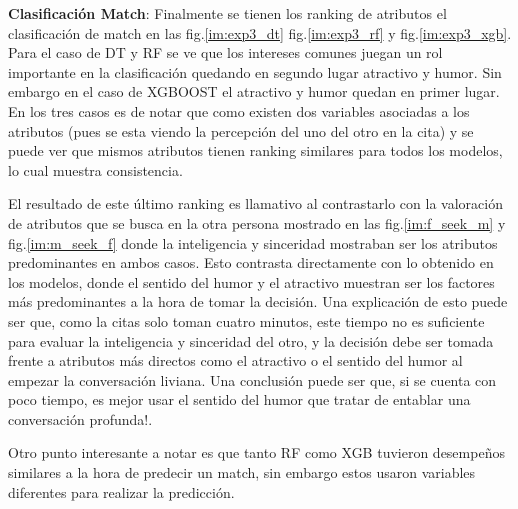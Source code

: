 


\textbf{Clasificación Match}: Finalmente se tienen los ranking de atributos el clasificación de match en las fig.\ref{im:exp3_dt} fig.\ref{im:exp3_rf} y fig.\ref{im:exp3_xgb}. Para el caso de DT y RF se ve que los intereses comunes juegan un rol importante en la clasificación quedando en segundo lugar atractivo y humor. Sin embargo en el caso de XGBOOST el atractivo y humor quedan en primer lugar. En los tres casos es de notar que como existen dos variables asociadas a los atributos (pues se esta viendo la percepción del uno del otro en la cita) y se puede ver que mismos atributos tienen ranking similares para todos los modelos, lo cual muestra consistencia.

El resultado de este último ranking es llamativo al contrastarlo con la valoración de atributos que se busca en la otra persona mostrado en las fig.\ref{im:f_seek_m} y fig.\ref{im:m_seek_f} donde la inteligencia y sinceridad mostraban ser los atributos predominantes en ambos casos. Esto contrasta directamente con lo obtenido en los modelos, donde el sentido del humor y el atractivo muestran ser los factores más predominantes a la hora de tomar la decisión. Una explicación de esto puede ser que, como la citas solo toman cuatro minutos, este tiempo no es suficiente para evaluar la inteligencia y sinceridad del otro, y la decisión debe ser tomada frente a atributos más directos como el atractivo o el sentido del humor al empezar la conversación liviana. Una conclusión puede ser que, si se cuenta con poco tiempo, es mejor usar el sentido del humor que tratar de entablar una conversación profunda!.

Otro punto interesante a notar es que tanto RF como XGB tuvieron desempeños similares a la hora de predecir un match, sin embargo estos usaron variables diferentes para realizar la predicción.





